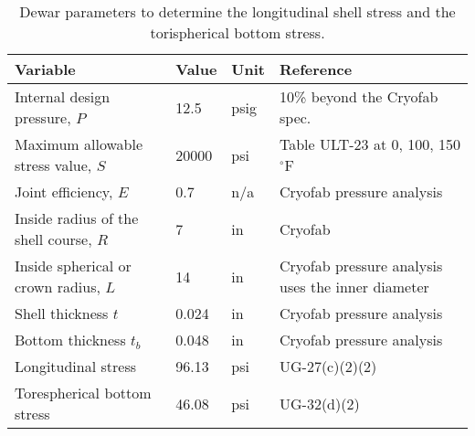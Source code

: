 \begin{table}[h]
\begin{center}
\tabcolsep=10pt
\begin{tabular}{>{\raggedleft}m{5cm}|l|l|m{6cm}}
\hline
\hline
Variable & Value & Unit & Reference \\
\hline
Internal design pressure, $P$ & 12.5 & psig & 10\% beyond the Cryofab spec. \\
Maximum allowable stress value, $S$ & 20000 & psi & Table ULT-23 at 0, 100, 150$^{\circ}$F \\
Joint efficiency, $E$ & 0.7 & n/a & Cryofab pressure analysis \\
Inside radius of the shell course, $R$ & 7 & in & Cryofab \\
Inside spherical or crown radius, $L$ & 14 & in & Cryofab pressure analysis uses 
the inner diameter \\
Shell thickness $t$ & 0.024 & in & Cryofab pressure analysis \\
Bottom thickness $t_b$ & 0.048 & in & Cryofab pressure analysis \\
\hline
Longitudinal stress & 96.13 & psi &  UG-27(c)(2)(2) \\
Torespherical bottom stress & 46.08 & psi & UG-32(d)(2) \\
\hline
\hline
\end{tabular}
\caption{Dewar parameters to determine the longitudinal shell stress
and the torispherical bottom stress.}
\label{table:dewar}
\end{center}
\end{table}

